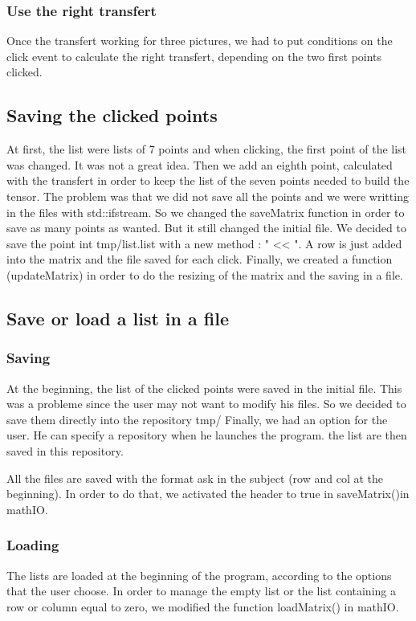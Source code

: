 \documentclass{report}
\begin{document}
\subsubsection{Use the right transfert}
Once the transfert working for three pictures, we had to put conditions on the click event to calculate the right transfert, depending on the two first points clicked.  

 
\subsection{Saving the clicked points}
At first, the list were lists of 7 points and when clicking, the first point of the list was changed. It was not a great idea. 
Then we add an eighth point, calculated with the transfert in order to keep the list of the seven points needed to build the tensor. The problem was that we did not save all the points and we were writting in the files with std::ifstream. So we changed the saveMatrix function in order to save as many points as wanted. But it still changed the initial file. 
We decided to save the point int tmp/list.list with a new method : " << ". A row is just added into the matrix and the file saved for each click. 
Finally, we created a function (updateMatrix) in order to do the resizing of the matrix and the saving in a file. 

\subsection{Save or load a list in a file}
\subsubsection{Saving}
At the beginning, the list of the clicked points were saved in the initial file. This was a probleme since the user may not want to modify his files. 
So we decided to save them directly into the repository tmp/ 
Finally, we had an option for the user. He can specify a repository when he launches the program. the list are then saved in this repository. 

All the files are saved with the format ask in the subject (row and col at the beginning). In order to do that, we activated the header to true in saveMatrix()in mathIO. 

\subsubsection{Loading}
The lists are loaded at the beginning of the program, according to the options that the user choose. In order to manage the empty list or the list containing a row or column equal to zero, we modified the function loadMatrix() in mathIO. 
\end{document}
